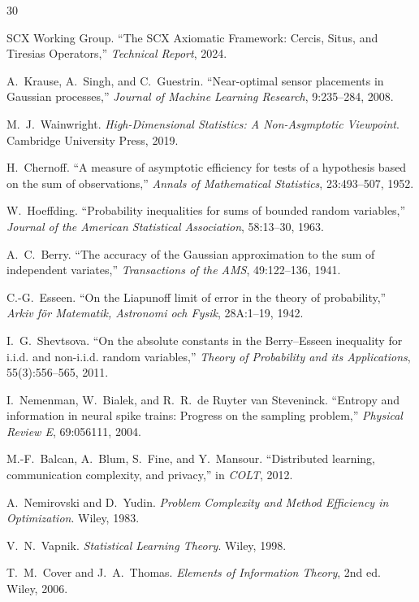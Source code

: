 \documentclass[12pt,a4paper]{article}
\begin{document}

\begin{thebibliography}{30}

SCX Working Group.
\newblock ``The SCX Axiomatic Framework: Cercis, Situs, and Tiresias
Operators,''
\newblock \emph{Technical Report}, 2024.

A.~Krause, A.~Singh, and C.~Guestrin.
\newblock ``Near-optimal sensor placements in Gaussian processes,''
\newblock \emph{Journal of Machine Learning Research}, 9:235--284, 2008.

M.~J.~Wainwright.
\newblock \emph{High-Dimensional Statistics: A Non-Asymptotic Viewpoint}.
\newblock Cambridge University Press, 2019.

H.~Chernoff.
\newblock ``A measure of asymptotic efficiency for tests of a hypothesis
based on the sum of observations,''
\newblock \emph{Annals of Mathematical Statistics}, 23:493--507, 1952.

W.~Hoeffding.
\newblock ``Probability inequalities for sums of bounded random variables,''
\newblock \emph{Journal of the American Statistical Association},
58:13--30, 1963.

A.~C.~Berry.
\newblock ``The accuracy of the Gaussian approximation to the sum of
independent variates,''
\newblock \emph{Transactions of the AMS}, 49:122--136, 1941.

C.-G.~Esseen.
\newblock ``On the Liapunoff limit of error in the theory of probability,''
\newblock \emph{Arkiv f\"or Matematik, Astronomi och Fysik}, 28A:1--19, 1942.

I.~G.~Shevtsova.
\newblock ``On the absolute constants in the Berry--Esseen inequality
for i.i.d. and non-i.i.d. random variables,''
\newblock \emph{Theory of Probability and its Applications}, 55(3):556--565, 2011.

I.~Nemenman, W.~Bialek, and R.~R.~de Ruyter van Steveninck.
\newblock ``Entropy and information in neural spike trains: Progress on the
sampling problem,''
\newblock \emph{Physical Review E}, 69:056111, 2004.

M.-F.~Balcan, A.~Blum, S.~Fine, and Y.~Mansour.
\newblock ``Distributed learning, communication complexity, and privacy,''
\newblock in \emph{COLT}, 2012.

A.~Nemirovski and D.~Yudin.
\newblock \emph{Problem Complexity and Method Efficiency in Optimization}.
\newblock Wiley, 1983.

V.~N.~Vapnik.
\newblock \emph{Statistical Learning Theory}.
\newblock Wiley, 1998.

T.~M.~Cover and J.~A.~Thomas.
\newblock \emph{Elements of Information Theory}, 2nd ed.
\newblock Wiley, 2006.

\end{thebibliography}
\end{document}
